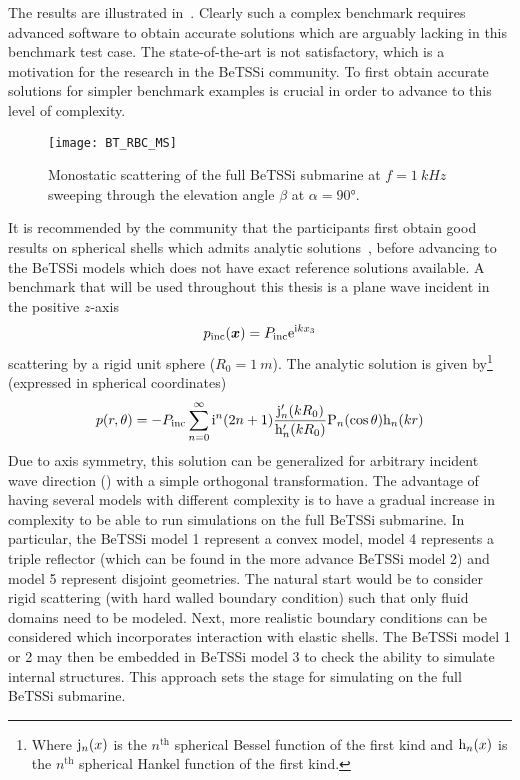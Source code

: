 The results are illustrated in~. Clearly such a complex benchmark requires advanced software to obtain accurate solutions which are arguably lacking in this benchmark test case. The state-of-the-art is not satisfactory, which is a motivation for the research in the BeTSSi community. To first obtain accurate solutions for simpler benchmark examples is crucial in order to advance to this level of complexity.
\begin{figure}
	\centering
	\texttt{[image: BT\_RBC\_MS]}
	\caption{Monostatic scattering of the full BeTSSi submarine at $f=\SI{1}{kHz}$ sweeping through the elevation angle $\beta$ at $\alpha=\ang{90}$.}
	\label{Fig:BT_RBC_MS}
\end{figure}
It is recommended by the community that the participants first obtain good results on spherical shells which admits analytic solutions~\cite{Venas2019e3s}, before advancing to the BeTSSi models which does not have exact reference solutions available.
A benchmark that will be used throughout this thesis is a plane wave incident in the positive $z$-axis
\begin{equation*}
	p_{\mathrm{inc}}(\vec{x}) = P_{\mathrm{inc}}\euler^{\imag k x_3}
\end{equation*} 
scattering by a rigid unit sphere ($R_0=\SI{1}{m}$). The analytic solution is given by\footnote{Where $\mathrm{j}_n(x)$ is the $n^{\mathrm{th}}$ spherical Bessel function of the first kind and $\mathrm{h}_n(x)$ is the $n^{\mathrm{th}}$ spherical Hankel function of the first kind.} (expressed in spherical coordinates)
\begin{equation}\label{Eq:S1rigid}
	p(r,\theta) = -P_{\mathrm{inc}}\sum_{n=0}^\infty \mathrm{i}^n (2n+1) \frac{\mathrm{j}_n'(kR_0)}{\mathrm{h}_n'(kR_0)} \mathrm{P}_n(\cos\theta)\mathrm{h}_n(kr)
\end{equation}
Due to axis symmetry, this solution can be generalized for arbitrary incident wave direction () with a simple orthogonal transformation. The advantage of having several models with different complexity is to have a gradual increase in complexity to be able to run simulations on the full BeTSSi submarine. In particular, the BeTSSi model 1 represent a convex model, model 4 represents a triple reflector (which can be found in the more advance BeTSSi model 2) and model 5 represent disjoint geometries. The natural start would be to consider rigid scattering (with hard walled boundary condition) such that only fluid domains need to be modeled. Next, more realistic boundary conditions can be considered which incorporates interaction with elastic shells. The BeTSSi model 1 or 2 may then be embedded in BeTSSi model 3 to check the ability to simulate internal structures. This approach sets the stage for simulating on the full BeTSSi submarine.